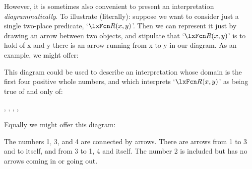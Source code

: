 
However, it is sometimes also convenient to present an interpretation
\emph{diagrammatically}. To illustrate (literally): suppose we want to
consider just a single two-place predicate, `$\atom{R}{x,y}$'. Then we
can represent it just by drawing an arrow between two objects, and
stipulate that `$\atom{R}{x,y}$' is to hold of x and y \ifeff{} there is an arrow running from x to y in our diagram. As an
example, we might offer:
\begin{center}
\end{center}
This diagram could be used to describe an interpretation whose domain is the first four positive whole numbers, and which interprets `$\atom{R}{x,y}$' as being true of and only of:
	\begin{center}
		, 
		, 
		, 
		, 
	\end{center}
Equally we might offer this diagram:

\begin{center}
\begin{arialabel}{The numbers 1, 3, and 4 are connected by arrows.
There are arrows from 1 to 3 and to itself, and from 3 to 1, 4 and itself. The number 2 is included but has no arrows coming in or going out.}
\end{arialabel}
\end{center}

